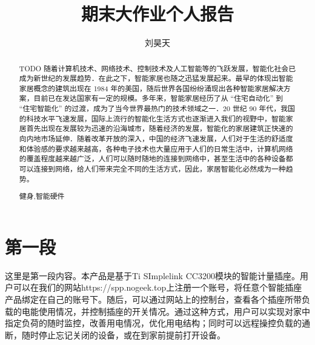 \documentclass[a4paper,12pt]{article}
\title{期末大作业个人报告}
\author{刘昊天}
\begin{document}
    \begin{abstract}
    TODO
        随着计算机技术、网络技术、控制技术及人工智能等的飞跃发展，智能化社会已成为新世纪的发展趋势．在此之下，智能家居也随之迅猛发展起来。最早的体现出智能家居概念的建筑出现在 1984 年的美国，随后世界各国纷纷涌现出各种智能家居解决方案，目前已在发达国家有一定的规模。多年来，智能家居经历了从 “住宅自动化” 到 “住宅智能化” 的过渡，成为了当今世界最热门的技术领域之一．20 世纪 90 年代，我国的科技水平飞速发展，国际上流行的智能化生活方式也逐渐进入我们的视野中，智能家居首先出现在发展较为迅速的沿海城市，随着经济的发展，智能化的家居建筑正快速的向内地市场延伸．随着改革开放的深入，中国的经济飞速发展，人们对于生活的舒适度和体验感的要求越来越高，各种电子技术也大量应用于人们的日常生活中，计算机网络的覆盖程度越来越广泛，人们可以随时随地的连接到网络中，甚至生活中的各种设备都可以连接到网络，给人们带来完全不同的生活方式，因此，家居智能化必然成为一种趋势。
        \begin{keywords}
            健身,智能硬件
        \end{keywords}
    \end{abstract}
    \maketitle
    \section{第一段} %
    \label{sec:第一段}
    这里是第一段内容。本产品是基于Ti SImplelink CC3200模块的智能计量插座。用户可以在我们的网站https://spp.nogeek.top上注册一个账号，将任意个智能插座产品绑定在自己的账号下。随后，可以通过网站上的控制台，查看各个插座所带负载的电能使用情况，并控制插座的开关情况。通过这种方式，用户可以实现对家中指定负荷的随时监控，改善用电情况，优化用电结构；同时可以远程操控负载的通断，随时停止忘记关闭的设备，或在到家前提前打开设备。
    \label{applastpage}
    \newpage
    
    
\iffalse
\begin{itemize}[noitemsep,topsep=0pt]
\end{itemize}
\begin{enumerate}[label=\Roman{*}.,noitemsep,topsep=0pt]
\end{enumerate}
\begin{multicols}{2}
\end{multicols}
\fi
\end{document}
